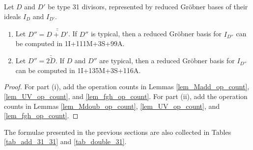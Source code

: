 \begin{theorem}
  Let $D$ and $D'$ be type 31 divisors,
  represented by reduced Gr\"obner bases of their ideals $I_D$ and $I_{D'}$.
  \begin{enumerate}[label=(\roman*)]
    \item
    Let $D'' = \bar{\bar{D + D'}}$.
    If $D''$ is typical, then a reduced Gr\"obner basis for $I_{D''}$
    can be computed in 1I+111M+3S+99A.

    \item
    Let $D'' = \bar{\bar{2D}}$.
    If $D$ and $D''$ are typical, then a reduced Gr\"obner basis for $I_{D''}$
    can be computed in 1I+135M+3S+116A.
  \end{enumerate}
\end{theorem}
\begin{proof}
  For part (i), add the operation counts in Lemmas
  \ref{lem_Madd_op_count}, \ref{lem_UV_op_count}, and \ref{lem_fgh_op_count}.
  For part (ii), add the operation counts in Lemmas
  \ref{lem_Mdoub_op_count}, \ref{lem_UV_op_count}, and \ref{lem_fgh_op_count}.
\end{proof}

The formulae presented in the previous sections are also collected
in Tables \ref{tab_add_31_31} and \ref{tab_double_31}.


